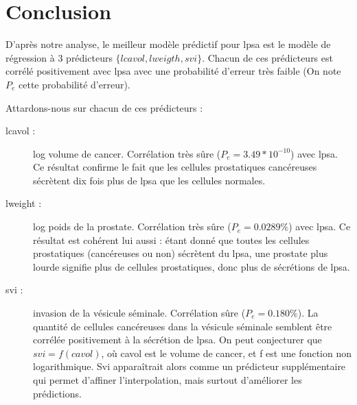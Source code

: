 \documentclass[a4paper, 12pt]{article}
\begin{document}
\section{Conclusion}

D'après notre analyse, le meilleur modèle prédictif pour lpsa est le modèle de régression à 3 prédicteurs $\{lcavol, lweigth, svi\}$. 
Chacun de ces prédicteurs est corrélé positivement avec lpsa avec une probabilité d'erreur très faible (On note $P_{e}$ cette probabilité d'erreur).

Attardons-nous sur chacun de ces prédicteurs :

\begin{description}
\item[lcavol :] log volume de cancer. Corrélation très sûre ($P_e = 3.49*10^{-10}$) avec lpsa. Ce résultat confirme le fait que les cellules prostatiques cancéreuses sécrètent dix fois plus de lpsa que les cellules normales.
\item[lweight :] log poids de la prostate. Corrélation très sûre ($P_e = 0.0289 \%$) avec lpsa. Ce résultat est cohérent lui aussi : étant donné que toutes les cellules prostatiques (cancéreuses ou non) sécrètent du lpsa, une prostate plus lourde signifie plus de cellules prostatiques, donc plus de sécrétions de lpsa.
\item[svi :] invasion de la vésicule séminale. Corrélation sûre ($P_e = 0.180 \%$). La quantité de cellules cancéreuses dans la vésicule séminale semblent être corrélée positivement à la sécrétion de lpsa. On peut conjecturer que $svi = f(cavol)$, où cavol est le volume de cancer, et f est une fonction non logarithmique. Svi apparaîtrait alors comme un prédicteur supplémentaire qui permet d'affiner l'interpolation, mais surtout d'améliorer les prédictions.
\end{description}
\end{document}

